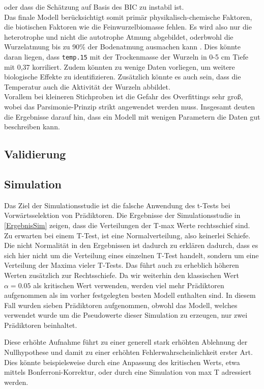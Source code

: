 oder dass die Schätzung auf Basis des BIC zu instabil ist.
\\
Das finale Modell berücksichtigt somit primär physikalisch-chemische Faktoren, die biotischen Faktoren wie die
Feinwurzelbiomasse fehlen. Es wird also nur die heterotrophe und nicht die autotrophe Atmung abgebildet,
oderbwohl die Wurzelatmung bis zu 90\% der Bodenatmung ausmachen kann \cite{diss}.
Dies könnte daran liegen, dass \texttt{temp.15} mit der Trockenmasse der Wurzeln in 0-5 cm Tiefe mit 0,37
korriliert. Zudem könnten zu wenige Daten vorliegen, um weitere biologische Effekte zu identifizieren. Zusätzlich könnte
es auch sein, dass die Temperatur auch die Aktivität der Wurzeln abbildet.
\\
Vorallem bei kleineren Stichproben ist die Gefahr des Overfittings sehr groß, wobei das
Parsimonie-Prinzip strikt angewendet werden muss. Insgesamt deuten die Ergebnisse darauf hin, dass ein Modell mit wenigen
Parametern die Daten gut beschreiben kann.

\subsection{Validierung}

\subsection{Simulation}
Das Ziel der Simulationsstudie ist die falsche Anwendung des t-Tests bei Vorwärtsselektion von
Prädiktoren. Die Ergebnisse der Simulationsstudie in \ref{ErgebnisSim} zeigen, dass die Verteilungen
der T-max Werte rechtsschief sind. Zu erwarten bei einem T-Test, ist eine Normalverteilung, also
keinerlei Schiefe. Die nicht Normalität in den Ergebnissen ist dadurch zu erklären dadurch, dass es sich
hier nicht um die Verteilung eines einzelnen T-Test handelt, sondern um eine Verteilung der
Maxima vieler T-Tests. Das führt auch zu erheblich höheren Werten zusätzlich zur
Rechtsschiefe. Da wir weiterhin den klassischen Wert $\alpha = 0.05$ als kritischen Wert
verwenden, werden viel mehr Prädiktoren aufgenommen als im vorher festgelegten besten Modell
enthalten sind. In diesem Fall wurden sieben Prädiktoren aufgenommen, obwohl das Modell, welches
verwendet wurde um die Pseudowerte dieser Simulation zu erzeugen, nur zwei Prädiktoren beinhaltet. 

Diese erhöhte Aufnahme führt zu einer generell stark erhöhten Ablehnung der Nullhypothese und damit zu
einer erhöhten Fehlerwahrscheinlichkeit erster Art. Dies könnte beispielsweise durch eine Anpassung des
kritischen Werts, etwa mittels Bonferroni-Korrektur, oder durch eine Simulation von max T adressiert
werden.

